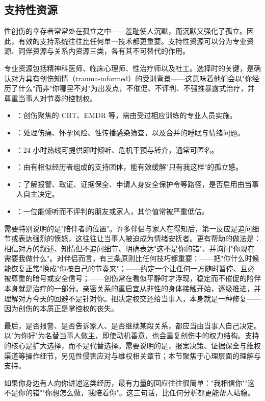 \subsection{支持性资源}

性创伤的幸存者常常处在孤立之中——羞耻使人沉默，而沉默又强化了孤立。因此，有效的支持系统往往比任何单一技术都更重要。支持性资源可以分为专业资源、同伴资源与关系内资源三类，各有其不可替代的作用。

专业资源包括精神科医师、临床心理师、性治疗师以及社工。选择时的关键，是确认对方具有创伤知情（trauma-informed）的受训背景——这意味着他们会以"你经历了什么"而非"你哪里不对"为出发点，不催促、不评判、不强推暴露式治疗，并尊重当事人对节奏的控制权。

\begin{itemize}
  \item {}：创伤聚焦的 CBT、EMDR 等，需由受过相应训练的专业人员实施。
  \item {}：处理伤痛、怀孕风险、性传播感染筛查，以及合并的睡眠与情绪问题。
  \item {}：24 小时热线可提供即时倾听、危机干预与转介，通常可匿名。
  \item {}：由有相似经历者组成的支持团体，能有效缓解"只有我这样"的孤立感。
  \item {}：了解报警、取证、证据保全、申请人身安全保护令等路径，是否启用由当事人自主决定。
  \item {}：一位能倾听而不评判的朋友或家人，其价值常被严重低估。
\end{itemize}

需要特别说明的是"陪伴者的位置"。许多伴侣与家人在得知后，第一反应是追问细节或表达强烈的愤怒，这往往让当事人被迫成为情绪安抚者。更有帮助的做法是：相信对方的叙述、知情但不追问细节、明确表达"这不是你的错"、并询问"你现在需要我做什么"。对伴侣而言，有三条原则比任何技巧都重要：——把"你什么时候能恢复正常"换成"你按自己的节奏来"；——约定一个让任何一方随时暂停、且必被尊重的暗号或安全信号；——创伤常在看似平静时才浮现，稳定而不催促的陪伴本身就是治疗的一部分。亲密关系的重启宜从非性的身体接触开始，逐级推进，并理解对方今天的回避不是针对你。把决定权交还给当事人，本身就是一种修复——因为创伤的本质正是掌控权的丧失。

最后，是否报警、是否告诉家人、是否继续某段关系，都应当由当事人自己决定。以"为你好"为名替当事人做主，即使动机善意，也会重复创伤中的权力结构。支持的核心是扩大选择，而不是代替选择。需要说明的是，报案决策、证据保全与维权渠道等操作细节，另见性侵害应对与维权相关章节；本节聚焦于心理层面的理解与支持。

\begin{tcolorbox}[colback=pink!5!white,colframe=red!50!black,title=贴心小叮咛]
如果你身边有人向你讲述这类经历，最有力量的回应往往很简单："我相信你""这不是你的错""你想怎么做，我陪着你"。这三句话，比任何分析都更能帮人站稳。
\end{tcolorbox}
